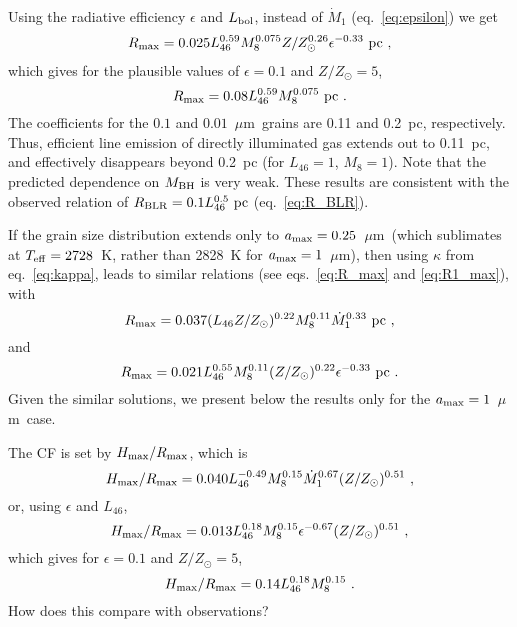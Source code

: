 \documentclass[a4paper,fleqn,usenatbib]{mnras}
\newcommand{\mdot}{\dot{M}}
\newcommand{\mic}{\mbox{$\mu$m}}
\begin{document}
Using the radiative efficiency $\epsilon$ and $L_{\rm bol}$, instead of $\mdot_1$ (eq.~\ref{eq:epsilon}) 
we get  
\begin{equation}
  R_{\rm max}=0.025L_{46}^{0.59}M_8^{0.075}Z/Z_{\odot}^{0.26}\epsilon^{-0.33}~{\rm  pc}\ , \label{eq:R1_max}
\end{equation}
which gives for the plausible values of $\epsilon=0.1$ and $Z/Z_{\odot}=5$, 
 \begin{equation}
R_{\rm max}=0.08L_{46}^{0.59}M_8^{0.075}~{\rm  pc}\ .
\label{eq:R2_max}
\end{equation}
The coefficients for the $0.1$ and $0.01$~\mic\ grains are 0.11 and 0.2~pc, respectively.
Thus, efficient line emission of directly illuminated gas extends  
out to 0.11~pc, and effectively disappears beyond 0.2~pc (for $L_{46}=1$,  
$M_8=1$). Note that the predicted dependence on $M_{\rm BH}$ is very weak.
These results are consistent with the observed relation of 
$R_{\rm BLR}=0.1L_{46}^{0.5}~{\rm  pc}$ (eq.~\ref{eq:R_BLR}).

If the grain size distribution extends only to $a_{\rm max}=0.25$~\mic\ (which sublimates at 
$T_{\rm eff}=2728$~K, rather than 2828~K for $a_{\rm max}=1$~\mic), then using 
$\kappa$ from eq.~\ref{eq:kappa}, leads to similar relations 
(see eqs.~\ref{eq:R_max} and \ref{eq:R1_max}), with
\begin{equation}
  R_{\rm max}=0.037(L_{46}Z/Z_{\odot})^{0.22}M_8^{0.11}\mdot_1^{0.33}~{\rm  pc}\ , 
\end{equation}
and
\begin{equation}
  R_{\rm max}=0.021L_{46}^{0.55}M_8^{0.11}(Z/Z_{\odot})^{0.22}\epsilon^{-0.33}~{\rm  pc}\ . 
\end{equation}
Given the similar solutions, we present below the results only for the $a_{\rm max}=1$~\mic\ case. 

The CF is set by $H_{\rm max}/R_{\rm max}$, which is
\begin{equation}
  H_{\rm max}/R_{\rm max}=0.040L_{46}^{-0.49}M_8^{0.15}\mdot_1^{0.67}(Z/Z_{\odot})^{0.51}\ ,
\end{equation}
or, using $\epsilon$ and $L_{46}$,
\begin{equation}
  H_{\rm max}/R_{\rm max}=0.013L_{46}^{0.18}M_8^{0.15}\epsilon^{-0.67}(Z/Z_{\odot})^{0.51}\ ,
\label{eq:HR11}
\end{equation}
which gives for $\epsilon=0.1$ and $Z/Z_{\odot}=5$, 
\begin{equation}
  H_{\rm max}/R_{\rm max}=0.14L_{46}^{0.18}M_8^{0.15}\ .
\label{eq:HR}
\end{equation}
How does this compare with observations?
\end{document}
